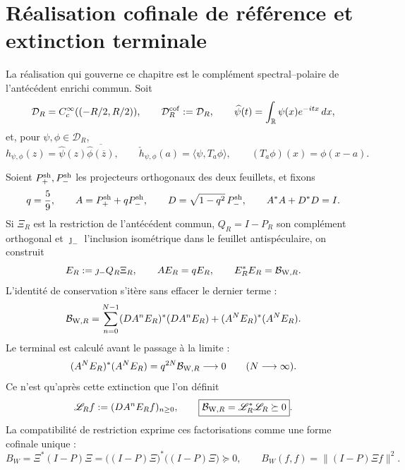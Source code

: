 \section*{Réalisation cofinale de référence et extinction terminale}

La réalisation qui gouverne ce chapitre est le complément spectral--polaire de l'antécédent enrichi commun. Soit
\[
 \mathcal D_R=C_c^\infty((-R/2,R/2)),\qquad
 \mathcal D_R^{\rm cof}:=\mathcal D_R,\qquad
 \widehat\psi(t)=\int_{\mathbb R}\psi(x)e^{-itx}\,dx ,
\]
et, pour \(\psi,\phi\in\mathcal D_R\),
\[
 h_{\psi,\phi}(z)
 =\widehat\psi(z)\overline{\widehat\phi(\overline z)},\qquad
 \check h_{\psi,\phi}(a)
 =\langle\psi,T_a\phi\rangle ,
 \qquad (T_a\phi)(x)=\phi(x-a).
\]

Soient \(P_+^{\rm sh},P_-^{\rm sh}\) les projecteurs orthogonaux des deux feuillets, et fixons
\begin{equation}\label{eq:amp-rh-owner-q}
 q=\frac59,\qquad
 A=P_+^{\rm sh}+qP_-^{\rm sh},\qquad
 D=\sqrt{1-q^2}\,P_-^{\rm sh},\qquad A^*A+D^*D=I.
\end{equation}
Si \(\Xi_R\) est la restriction de l'antécédent commun, \(Q_R=I-P_R\) son complément orthogonal et \(\jmath_-\) l'inclusion isométrique dans le feuillet antispéculaire, on construit
\begin{equation}\label{eq:amp-rh-owner-binding}
 E_R:=\jmath_-Q_R\Xi_R,\qquad
 AE_R=qE_R,\qquad
 E_R^*E_R=\mathcal B_{{\rm W},R}.
\end{equation}
L'identité de conservation s'itère sans effacer le dernier terme :
\begin{equation}\label{eq:amp-rh-owner-telescopia}
 \mathcal B_{{\rm W},R}
 =\sum_{n=0}^{N-1}(DA^nE_R)^*(DA^nE_R)
 +(A^NE_R)^*(A^NE_R).
\end{equation}
Le terminal est calculé avant le passage à la limite :
\begin{equation}\label{eq:amp-rh-owner-terminal}
 (A^NE_R)^*(A^NE_R)
 =q^{2N}\mathcal B_{{\rm W},R}\longrightarrow0
 \qquad(N\longrightarrow\infty).
\end{equation}
Ce n'est qu'après cette extinction que l'on définit
\begin{equation}\label{eq:amp-rh-owner-l}
 \mathscr L_Rf:=(DA^nE_Rf)_{n\geq0},
 \qquad
 \boxed{\mathcal B_{{\rm W},R}=\mathscr L_R^*\mathscr L_R\succeq0}.
\end{equation}
La compatibilité de restriction exprime ces factorisations comme une forme cofinale unique :
\begin{equation}\label{eq:amp-rh-owner-publicacion}
 B_W=\Xi^*(I-P)\Xi
 =\bigl((I-P)\Xi\bigr)^*\bigl((I-P)\Xi\bigr)\succeq0,
 \qquad
 B_W(f,f)=\|(I-P)\Xi f\|^2.
\end{equation}

